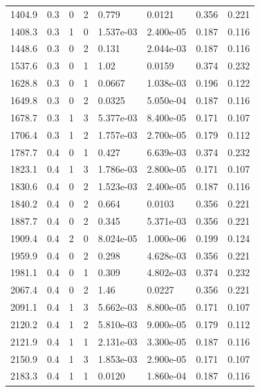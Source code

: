 \documentclass[preview]{standalone}
\begin{document}
{{{\begin{tabular}{L{1.2cm}C{1.2cm} C{0.3cm}C{0.5cm} C{1.4cm}C{1.4cm} C{1.4cm}C{1.4cm}}
  1404.9  &   0.3  & 0     &  2 &  0.779  & 0.0121  & 0.356 &  0.221   \\ 
  1408.3  &   0.3  & 1     &  0 &  1.537e-03  & 2.400e-05  & 0.187 &  0.116   \\ 
  1448.6  &   0.3  & 0     &  2 &  0.131  & 2.044e-03  & 0.187 &  0.116   \\ 
  1537.6  &   0.3  & 0     &  1 &  1.02  & 0.0159  & 0.374 &  0.232   \\ 
  1628.8  &   0.3  & 0     &  1 &  0.0667  & 1.038e-03  & 0.196 &  0.122   \\ 
  1649.8  &   0.3  & 0     &  2 &  0.0325  & 5.050e-04  & 0.187 &  0.116   \\ 
  1678.7  &   0.3  & 1     &  3 &  5.377e-03  & 8.400e-05  & 0.171 &  0.107   \\ 
  1706.4  &   0.3  & 1     &  2 &  1.757e-03  & 2.700e-05  & 0.179 &  0.112   \\ 
  1787.7  &   0.4  & 0     &  1 &  0.427  & 6.639e-03  & 0.374 &  0.232   \\ 
  1823.1  &   0.4  & 1     &  3 &  1.786e-03  & 2.800e-05  & 0.171 &  0.107   \\ 
  1830.6  &   0.4  & 0     &  2 &  1.523e-03  & 2.400e-05  & 0.187 &  0.116   \\ 
  1840.2  &   0.4  & 0     &  2 &  0.664  & 0.0103  & 0.356 &  0.221   \\ 
  1887.7  &   0.4  & 0     &  2 &  0.345  & 5.371e-03  & 0.356 &  0.221   \\ 
  1909.4  &   0.4  & 2     &  0 &  8.024e-05  & 1.000e-06  & 0.199 &  0.124   \\ 
  1959.9  &   0.4  & 0     &  2 &  0.298  & 4.628e-03  & 0.356 &  0.221   \\ 
  1981.1  &   0.4  & 0     &  1 &  0.309  & 4.802e-03  & 0.374 &  0.232   \\ 
  2067.4  &   0.4  & 0     &  2 &  1.46  & 0.0227  & 0.356 &  0.221   \\ 
  2091.1  &   0.4  & 1     &  3 &  5.662e-03  & 8.800e-05  & 0.171 &  0.107   \\ 
  2120.2  &   0.4  & 1     &  2 &  5.810e-03  & 9.000e-05  & 0.179 &  0.112   \\ 
  2121.9  &   0.4  & 1     &  1 &  2.131e-03  & 3.300e-05  & 0.187 &  0.116   \\ 
  2150.9  &   0.4  & 1     &  3 &  1.853e-03  & 2.900e-05  & 0.171 &  0.107   \\ 
  2183.3  &   0.4  & 1     &  1 &  0.0120  & 1.860e-04  & 0.187 &  0.116   \\ 

\end{tabular}}}}
\end{document}
